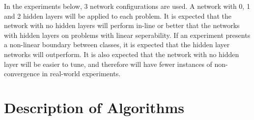 \documentclass{amsart}
\begin{document}
    In the experiments below, 3 network configurations are used.
    A network with 0, 1 and 2 hidden layers will be applied to
    each problem. It is expected that the network with no hidden
    layers will perform in-line or better that the networks with
    hidden layers on problems with linear seperability. If an
    experiment presents a non-linear boundary between classes,
    it is expected that the hidden layer networks will outperform.
    It is also expected that the network with no hidden layer will be
    easier to tune, and therefore will have fewer instances of non-convergence
    in real-world experiments.

    \section{Description of Algorithms}
\end{document}
